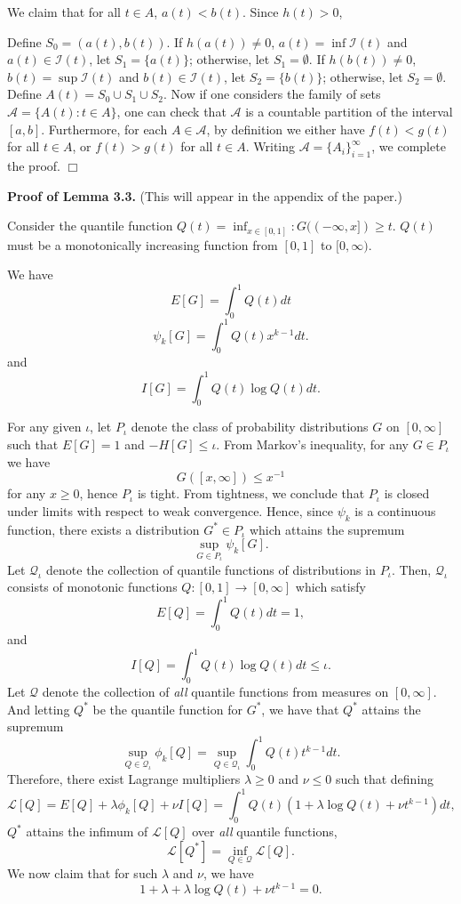 \documentclass[12pt]{article}
\begin{document}
We claim that for all $t \in A$, $a(t) < b(t)$.  Since $h(t) > 0$, 

Define $S_0 = (a(t), b(t))$.
If $h(a(t)) \neq 0$, $a(t) = \inf \mathcal{I}(t)$ and $a(t) \in \mathcal{I}(t)$, let $S_1 = \{a(t)\}$; otherwise, let $S_1 = \emptyset$.
If $h(b(t)) \neq 0$, $b(t) = \sup \mathcal{I}(t)$ and $b(t) \in \mathcal{I}(t)$, let $S_2 = \{b(t)\}$; otherwise, let $S_2 = \emptyset$.
Define $A(t) = S_0 \cup S_1 \cup S_2$.
Now if one considers the family of sets $\mathcal{A} = \{A(t): t \in A\}$,
one can check that $\mathcal{A}$ is a countable partition of the interval $[a,b]$.
Furthermore, for each $A \in \mathcal{A}$, by definition we either have $f(t) < g(t)$ for all $t \in A$,  or $f(t)> g(t)$ for all $t \in A$.
Writing $\mathcal{A} = \{A_i\}_{i=1}^\infty$, we complete the proof.  $\Box$ 




\textbf{Proof of Lemma 3.3.} (This will appear in the appendix of the paper.)

Consider the quantile function $Q(t) = \inf_{x \in [0,1]}: G((-\infty, x]) \geq t.$
$Q(t)$ must be a monotonically increasing function from $[0,1]$ to $[0,\infty).$

We have
\[
E[G] = \int_0^1 Q(t) dt
\]
\[
\psi_k[G] = \int_0^1 Q(t) x^{k-1} dt.
\]
and
\[
I[G] = \int_0^1 Q(t) \log Q(t) dt.
\]

For any given $\iota$, let $P_\iota$ denote the class of probability
distributions $G$ on $[0, \infty]$ such that $E[G]=1$ and
$-H[G] \leq \iota.$  From Markov's inequality, for any $G \in P_\iota$
we have
\[
G([x, \infty]) \leq x^{-1}
\]
for any $x \geq 0$, hence $P_\iota$ is tight.  From tightness, we
conclude that $P_\iota$ is closed under limits with respect to weak
convergence.  Hence, since $\psi_k$ is a continuous function, there
exists a distribution $G^* \in P_\iota$ which attains the supremum
\[\sup_{G \in P_\iota} \psi_k[G].\]
Let $\mathcal{Q}_\iota$ denote the collection of quantile functions of
distributions in $P_\iota.$ Then, $\mathcal{Q}_\iota$ consists of monotonic functions
$Q: [0,1] \to [0, \infty]$ which
satisfy
\[
E[Q] = \int_0^1 Q(t) dt = 1,
\]
and
\[
I[Q] = \int_0^1 Q(t) \log Q(t) dt \leq \iota.
\]
Let $\mathcal{Q}$ denote the collection of \emph{all} quantile functions from measures on $[0,\infty]$.
And letting $Q^*$ be the quantile function for $G^*$, we have that
$Q^*$ attains the supremum
\[
\sup_{Q \in \mathcal{Q}_\iota} \phi_k[Q] = \sup_{Q \in \mathcal{Q}_\iota} \int_0^1 Q(t) t^{k-1} dt.
\]
Therefore, there exist Lagrange multipliers
$\lambda \geq 0$ and $\nu \leq 0$ such that defining
\[
\mathcal{L}[Q] = E[Q] + \lambda \phi_k[Q] + \nu I[Q] = \int_0^1 Q(t) (1 + \lambda \log Q(t) + \nu t^{k-1}) dt,
\]
$Q^*$ attains the infimum of $\mathcal{L}[Q]$ over \emph{all} quantile functions,
\[
\mathcal{L}[Q^*] = \inf_{Q \in \mathcal{Q}}\mathcal{L}[Q].
\]
We now claim that for such $\lambda$ and $\nu$, we have
\[
1 + \lambda + \lambda \log Q(t) + \nu t^{k-1} = 0.
\]
\end{document}
